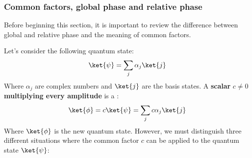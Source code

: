 \subsubsection{Common factors, global phase and relative phase}\label{sec:common-factors-global-phase-and-relative-phase}

Before beginning this section, it is important to review the difference between global and relative phase and the meaning of common factors.

\highspace
Let's consider the following quantum state:
\begin{equation*}
    \ket{\psi} = \sum_j \alpha_j \ket{j}
\end{equation*}
Where $\alpha_j$ are complex numbers and $\ket{j}$ are the basis states. A \textbf{scalar} $c \neq 0$ \textbf{multiplying every amplitude} is a :
\begin{equation}
    \ket{\phi} = c \ket{\psi} = \sum_j c \alpha_j \ket{j}
\end{equation}
Where $\ket{\phi}$ is the new quantum state. However, we must distinguish three different situations where the common factor $c$ can be applied to the quantum state $\ket{\psi}$:
